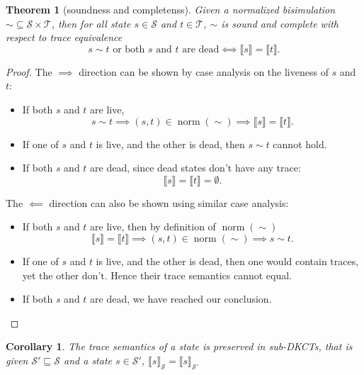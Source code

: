 \documentclass[acmsmall,screen]{acmart}
\newtheorem{corollary}{Corollary}
\newtheorem{theorem}{Theorem}
\DeclareMathOperator{\norm}{\mathrm{norm}}
\begin{document}
\begin{theorem}[soundness and completenss]
    Given a normalized bisimulation \({∼} ⊆ 𝒮 × 𝒯\), then for all state \(s ∈ 𝒮\) and \(t ∈ 𝒯\), \(∼\) is sound and complete with respect to trace equivalence
    \[s ∼ t \text{ or both \(s\) and \(t\) are dead} ⟺ ⟦s⟧ = ⟦t⟧.\]
\end{theorem}

\begin{proof}
    The \(⟹\) direction can be shown by case analysis on the liveness of \(s\) and \(t\):
    \begin{itemize}
        \item If both \(s\) and \(t\) are live, 
            \[s ∼ t ⟹ (s, t) ∈ \norm(∼) ⟹ ⟦s⟧ = ⟦t⟧.\]
        \item If one of \(s\) and \(t\) is live, and the other is dead, then \(s ∼ t\) cannot hold.
        \item If both \(s\) and \(t\) are dead, since dead states don't have any trace:
            \[⟦s⟧ = ⟦t⟧ = ∅.\]
    \end{itemize}

    The \(⟸\) direction can also be shown using similar case analysis:
    \begin{itemize}
        \item If both \(s\) and \(t\) are live, then by definition of \(\norm(∼)\)
            \[⟦s⟧ = ⟦t⟧ ⟹ (s, t) ∈ \norm(∼) ⟹ s ∼ t.\]
        \item If one of \(s\) and \(t\) is live, and the other is dead, then one would contain traces, yet the other don't. Hence their trace semantics cannot equal.
        \item If both \(s\) and \(t\) are dead, we have reached our conclusion.
    \end{itemize}
\end{proof}

\begin{corollary}
    The trace semantics of a state is preserved in sub-DKCTs, that is given \(𝒮 '⊑ 𝒮\) and a state \(s ∈ 𝒮'\), \(⟦s⟧_{𝒮} = ⟦s⟧_{𝒮'}\)
\end{corollary}
\end{document}
